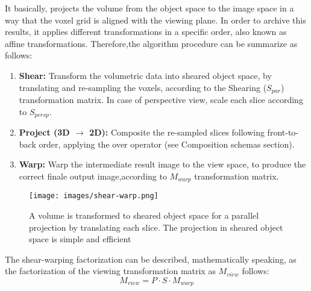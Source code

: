 \documentclass[12pt,a4paper]{extarticle}
\begin{document}
It basically, projects the volume from the object space to the image space in a way that the voxel grid is aligned with the viewing plane.
In order to archive this results, it applies different transformations in a specific order, also known as affine transformations.
Therefore,the algorithm procedure can be summarize as follows:
\begin{enumerate}
\item \textbf{Shear:} Transform the volumetric data into sheared object space, by translating and re-sampling the voxels, according to the Shearing ($S_{par}$) transformation matrix. In case of perspective view, scale each slice according to $S_{persp}$.
\item \textbf{Project (3D $\rightarrow$ 2D):} Composite the re-sampled slices following front-to-back order, applying the over operator (see Composition schemas section).
\item \textbf{Warp:} Warp the intermediate result image to the view space, to produce the correct finale output image,according to $M_{warp}$ transformation matrix.
\end{enumerate} %

\begin{figure}[hbtp]
\centering
\texttt{[image: images/shear-warp.png]}
\caption{ A volume is transformed to sheared object space for
a parallel projection by translating each slice. The projection in
sheared object space is simple and efficient}
\end{figure}

The shear-warping factorization can be described, mathematically speaking, as the factorization of the viewing transformation matrix as $M_{view}$ follows:
\[
M_{view} = P \cdot S \cdot M_{warp}
\]
\end{document}
